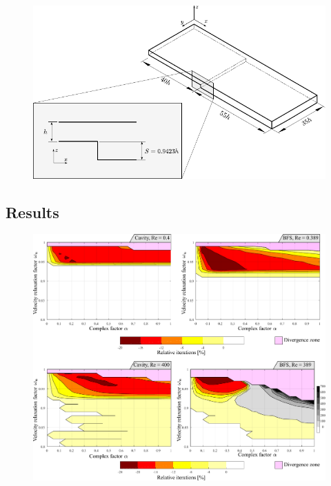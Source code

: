 \documentclass[final,3p,times,10pt,onecolumn]{myElsarticle}
\numberwithin{equation}{section}
\begin{document}
\begin{figure}[H]
\centering
\includegraphics[width=14cm]{fig/Cases/Geometria3.pdf}
\caption{}
\label{Fig:Geometria3}
\end{figure}  

\subsection{Results}

\begin{figure}[H]
\centering
\includegraphics[width=17cm]{fig/Results/FactorLowRe.pdf}
\caption{}
\label{Fig:Geometria3}
\end{figure}

\end{document}
